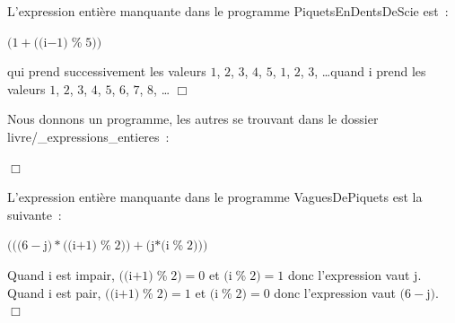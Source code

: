 \begin{corrige} {L'expression entière manquante dans le programme {\idt Piquets\-En\-Dents\-De\-Scie} est~:
\begin{center}
$(1 + ((${\idt i}$ - 1)\;${\idt \%}$\;5))$
\end{center}
qui prend successivement les valeurs $1$, $2$, $3$, $4$, $5$, $1$, $2$, $3$, \dots quand {\idt i} prend les
valeurs $1$, $2$, $3$, $4$, $5$, $6$, $7$, $8$, \ldots
\noindent $\Box$}\end{corrige}
\begin{corrige} {Nous donnons un programme, les autres se trouvant dans le dossier
{\idt livre/\_expressions\_entieres}~:

\noindent $\Box$}\end{corrige}
\begin{corrige} {L'expression entière manquante dans le programme {\idt VaguesDePiquets} est la suivante~:
\begin{center}
$(((6-${\idt j}$)\ast ((${\idt i}$+1)\;${\idt \%}$\;2))+(${\idt j}$\ast(${\idt i}$\;${\idt \%}$\;2)))$
\end{center}
Quand {\idt i} est impair, $((${\idt i}$+1)\;${\idt \%}$\;2) = 0$ et $(${\idt i}$\;${\idt \%}$\;2) = 1$
donc l'expression vaut {\idt j}. Quand {\idt i} est pair, $((${\idt i}$+1)\;${\idt \%}$\;2) = 1$ et 
$(${\idt i}$\;${\idt \%}$\;2) = 0$ donc l'expression vaut $(6-${\idt j}$)$.
$\Box$}\end{corrige}

